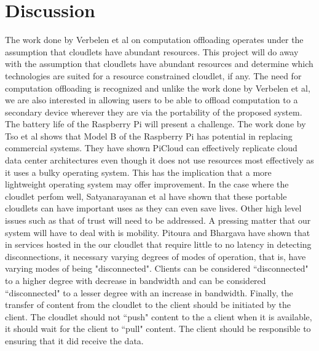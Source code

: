 \section{Discussion}
The work done by Verbelen et al\cite{RefWorks:93} on computation offloading operates under the assumption that cloudlets have abundant resources.
This project will do away with the assumption that cloudlets have abundant resources and determine which technologies are suited for a resource constrained cloudlet, if any. The need for computation offloading is recognized and unlike the work done by Verbelen et al\cite{RefWorks:93}, we are also interested in  allowing users to be able to offload computation to a secondary device wherever they are via the portability of the proposed system. The battery life of the Raspberry Pi will present a challenge. The work done by Tso et al\cite{tso2013glasgow} shows that Model B of the Raspberry Pi has potential in replacing commercial systems. They have shown PiCloud can effectively replicate cloud data center architectures even though it does not use resources most effectively as it uses a bulky operating system. This has the implication that a more lightweight operating system may offer improvement. In the case where the cloudlet perfom well, Satyanarayanan et al\cite{RefWorks:107} have shown that these portable cloudlets can have important uses as they can even save lives. Other high level issues such as that of trust will need to be addressed. A pressing matter that our system will have to deal with is mobility. Pitoura and Bhargava\cite{pitoura1993dealing} have shown that in services hosted in the our cloudlet that require little to no latency in detecting disconnections, it necessary varying degrees of modes of operation, that is, have varying modes of being "disconnected". Clients can be considered ``disconnected" to a higher degree with decrease in bandwidth and can be considered ``disconnected" to a lesser degree with an increase in bandwidth. Finally, the transfer of content from the cloudlet to the client should be initiated by the client. The cloudlet should not ``push" content to the a client when it is available, it should wait for the client to ``pull" content. The client should be responsible to ensuring that it did receive the data.
